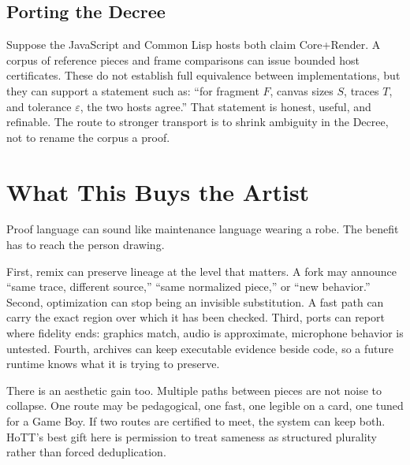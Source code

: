\documentclass[10pt,letterpaper,twocolumn]{article}
\newcommand{\claim}[1]{\textsf{#1}}
\begin{document}
\subsection{Porting the Decree}

Suppose the JavaScript and Common Lisp hosts both claim \claim{Core+Render}. A corpus of reference pieces and frame comparisons can issue bounded host certificates. These do not establish full equivalence between implementations, but they can support a statement such as: ``for fragment $F$, canvas sizes $S$, traces $T$, and tolerance $\varepsilon$, the two hosts agree.'' That statement is honest, useful, and refinable. The route to stronger transport is to shrink ambiguity in the Decree, not to rename the corpus a proof.

\section{What This Buys the Artist}
\label{sec:artist}

Proof language can sound like maintenance language wearing a robe. The benefit has to reach the person drawing.

First, remix can preserve lineage at the level that matters. A fork may announce ``same trace, different source,'' ``same normalized piece,'' or ``new behavior.'' Second, optimization can stop being an invisible substitution. A fast path can carry the exact region over which it has been checked. Third, ports can report where fidelity ends: graphics match, audio is approximate, microphone behavior is untested. Fourth, archives can keep executable evidence beside code, so a future runtime knows what it is trying to preserve.

There is an aesthetic gain too. Multiple paths between pieces are not noise to collapse. One route may be pedagogical, one fast, one legible on a card, one tuned for a Game Boy. If two routes are certified to meet, the system can keep both. HoTT's best gift here is permission to treat sameness as structured plurality rather than forced deduplication.
\end{document}
